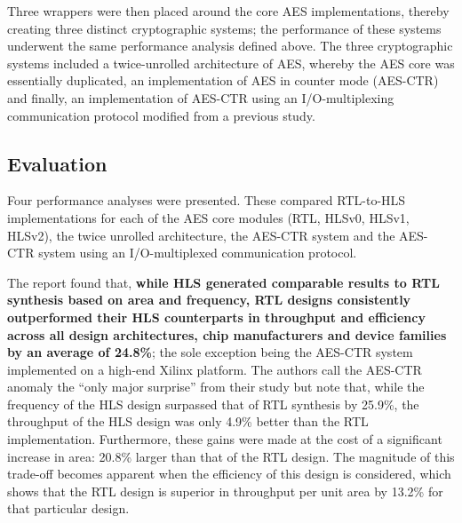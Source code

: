 \documentclass[12pt,journal,compsoc,onecolumn]{IEEEtran}
\begin{document}
Three wrappers were then placed around the core AES implementations, thereby creating three distinct cryptographic systems; the performance of these systems underwent the same performance analysis defined above. The three cryptographic systems included a twice-unrolled architecture of AES, whereby the AES core was essentially duplicated, an implementation of AES in counter mode (AES-CTR) and finally, an implementation of AES-CTR using an I/O-multiplexing communication protocol modified from a previous study\cite{20}.


\subsection{Evaluation}\label{sec:evaluation}

Four performance analyses were presented. These compared RTL-to-HLS implementations for each of the AES core modules (RTL, HLSv0, HLSv1, HLSv2), the twice unrolled architecture, the AES-CTR system and the AES-CTR system using an I/O-multiplexed communication protocol. 

The report found that, \textbf{while HLS generated comparable results to RTL synthesis based on area and frequency, RTL designs consistently outperformed their HLS counterparts in throughput and efficiency across all design architectures, chip manufacturers and device families by an average of 24.8\%}; the sole exception being the AES-CTR system implemented on a high-end Xilinx platform. The authors call the AES-CTR anomaly the ``only major surprise'' from their study but note that, while the frequency of the HLS design surpassed that of RTL synthesis by 25.9\%, the throughput of the HLS design was only 4.9\% better than the RTL implementation. Furthermore, these gains were made at the cost of a significant increase in area: 20.8\% larger than that of the RTL design. The magnitude of this trade-off becomes apparent when the efficiency of this design is considered, which shows that the RTL design is superior in throughput per unit area by 13.2\% for that particular design.
\end{document}
